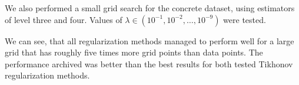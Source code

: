 We also performed a small grid search for the concrete dataset, using estimators
of level three and four.
Values of \(\lambda \in (10^{-1}, 10^{-2}, \ldots, 10^{-9})\) were tested.

We can see, that all regularization methods managed to perform well for a
large grid that has roughly five times more grid points than data points.
The performance archived was better than the best results for both tested
Tikhonov regularization methods.


